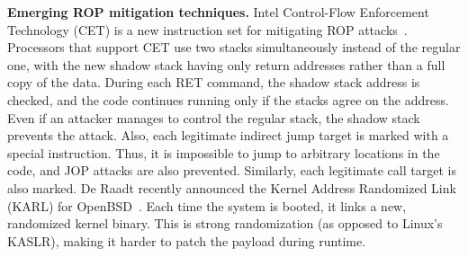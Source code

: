 \smallskip
\noindent\textbf{Emerging ROP mitigation techniques.}
Intel Control-Flow Enforcement Technology (CET) is a new instruction set for mitigating ROP attacks~\cite{Int17}. Processors that support CET use two stacks simultaneously instead of the regular one, with the new shadow stack having only return addresses rather than a full copy of the data. During each RET command, the shadow stack address is checked, and the code continues running only if the stacks agree on the address. Even if an attacker manages to control the regular stack, the shadow stack prevents the attack. Also, each legitimate indirect jump target is marked with a special instruction. Thus, it is impossible to jump to arbitrary locations in the code, and JOP attacks are also prevented. Similarly, each legitimate call target is also marked. De Raadt recently announced the Kernel Address Randomized Link (KARL) for OpenBSD~\cite{dr17}. Each time the system is booted, it links a new, randomized kernel binary. This is strong randomization (as opposed to Linux’s KASLR), making it harder to patch the payload during runtime. 

